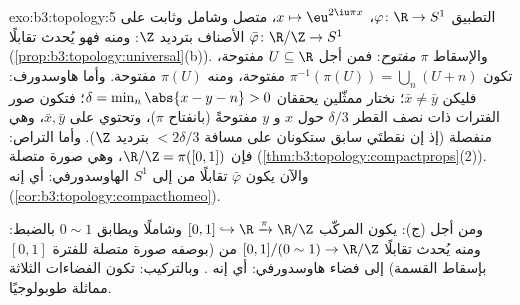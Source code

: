 \begin{solution}{exo:b3:topology:5}
التطبيق $\varphi \colon \R \to S^1$، $x \mapsto \eu^{2\iu\pi x}$، متصل وشامل وثابت على الأصناف بترديد
$\Z$: ومنه فهو يُحدث تقابلًا  $\bar\varphi \colon \R/\Z \to
S^1$ (\cref{prop:b3:topology:universal}(b)).
والإسقاط $\pi$ \emph{مفتوح}: فمن أجل $U \subseteq \R$ مفتوحة،
تكون $\pi^{-1}(\pi(U)) = \bigcup_{n}(U + n)$ مفتوحة، ومنه $\pi(U)$ مفتوحة. وأما هاوسدورف: فليكن
$\bar x \neq \bar y$؛ نختار ممثّلين يحققان $\delta = \min_{n}\abs{x - y - n} > 0$؛ فتكون صور الفترات ذات
نصف القطر $\delta/3$ حول $x$ و $y$ مفتوحةً (بانفتاح $\pi$)،
وتحتوي على $\bar x, \bar y$، وهي منفصلة (إذ إن نقطتَي سابق
ستكونان على مسافة $< 2\delta/3$ بترديد $\Z$). وأما التراص:
فإن $\R/\Z = \pi([0,1])$، وهي صورة متصلة  (\cref{thm:b3:topology:compactprops}(2)). والآن
يكون $\bar\varphi$ تقابلًا  من  إلى $S^1$
الهاوسدورفي: أي إنه  (\cref{cor:b3:topology:compacthomeo}).

ومن أجل (ج): يكون المركّب $[0,1] \hookrightarrow \R
\xrightarrow{\pi} \R/\Z$  وشاملًا ويطابق $0 \sim 1$
بالضبط: ومنه يُحدث تقابلًا  $[0,1]/(0\sim1) \to \R/\Z$ من  (بوصفه
صورة متصلة للفترة $[0,1]$ بإسقاط القسمة) إلى فضاء هاوسدورفي:
أي إنه . وبالتركيب: تكون الفضاءات الثلاثة مماثلة
طوبولوجيًا.
\end{solution}

